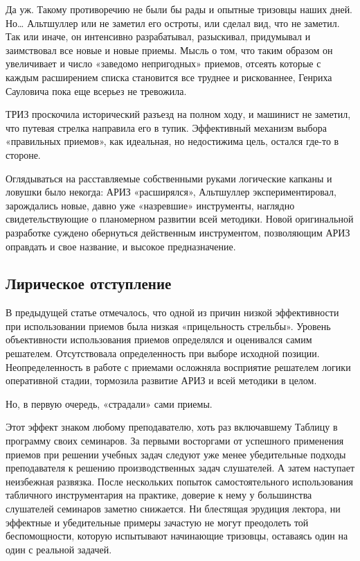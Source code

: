 \documentclass[11pt,a4paper]{article}
\begin{document}
Да уж. Такому противоречию не были бы рады и опытные тризовцы наших дней. Но…
Альтшуллер или не заметил его остроты, или сделал вид, что не заметил. Так или
иначе, он интенсивно разрабатывал, разыскивал, придумывал и заимствовал все
новые и новые приемы. Мысль о том, что таким образом он увеличивает и число
«заведомо непригодных» приемов, отсеять которые с каждым расширением списка
становится все труднее и рискованнее, Генриха Сауловича пока еще всерьез не
тревожила.

ТРИЗ проскочила исторический разъезд на полном ходу, и машинист не заметил,
что путевая стрелка направила его в тупик. Эффективный механизм выбора
«правильных приемов», как идеальная, но недостижима цель, остался где-то в
стороне.

Оглядываться на расставляемые собственными руками логические капканы и ловушки
было некогда: АРИЗ «расширялся», Альтшуллер экспериментировал, зарождались
новые, давно уже «назревшие» инструменты, наглядно свидетельствующие о
планомерном развитии всей методики. Новой оригинальной разработке суждено
обернуться действенным инструментом, позволяющим АРИЗ оправдать и свое
название, и высокое предназначение.

\subsection*{Лирическое отступление}

В предыдущей статье отмечалось, что одной из причин низкой эффективности при
использовании приемов была низкая «прицельность стрельбы». Уровень
объективности использования приемов определялся и оценивался самим
решателем. Отсутствовала определенность при выборе исходной
позиции. Неопределенность в работе с приемами осложняла восприятие решателем
логики оперативной стадии, тормозила развитие АРИЗ и всей методики в целом.

Но, в первую очередь, «страдали» сами приемы.

Этот эффект знаком любому преподавателю, хоть раз включавшему Таблицу в
программу своих семинаров. За первыми восторгами от успешного применения
приемов при решении учебных задач следуют уже менее убедительные подходы
преподавателя к решению производственных задач слушателей. А затем наступает
неизбежная развязка. После нескольких попыток самостоятельного использования
табличного инструментария на практике, доверие к нему у большинства слушателей
семинаров заметно снижается. Ни блестящая эрудиция лектора, ни эффектные и
убедительные примеры зачастую не могут преодолеть той беспомощности, которую
испытывают начинающие тризовцы, оставаясь один на один с реальной задачей.
\end{document}
